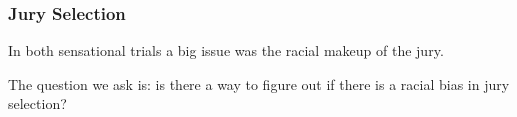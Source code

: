 \documentclass[handout]{beamer}
\newcommand{\blue}[1]{\textcolor{blue2}{#1}}
\begin{document}
%
%
%
%
%
%


\begin{frame}[fragile]
\frametitle{Jury Selection}

In both sensational trials a big issue was the \blue{racial makeup} of the jury.  

\vspace{0.5cm}

\pause The question we ask is: is there a way to figure out if there is a \blue{racial bias} in jury selection?  

\end{frame}
\end{document}
